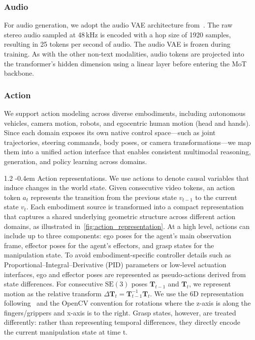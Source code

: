 \documentclass{llmxive}
\makeatletter
\providecommand{\paragraph}{  \@startsection{paragraph}{4}{\z@}    {1\baselineskip \@plus .2\baselineskip}    {-0.4em}    {\normalfont\normalsize\bfseries}}
\providecommand{\vidvar}{v}
\providecommand{\actvar}{a}
\providecommand{\vidtok}{\vidvar}
\providecommand{\acttok}{\actvar}
\makeatother
\begin{document}
\subsubsection{Audio}
For audio generation, we adopt the audio VAE architecture from~\citet{lee2024etta}. The raw stereo audio sampled at 48\,kHz is encoded with a hop size of 1920 samples, resulting in 25 tokens per second of audio. The audio VAE is frozen during training. As with the other non-text modalities, audio tokens are projected into the transformer's hidden dimension using a linear layer before entering the MoT backbone.

\subsubsection{Action}
\label{sec:action}
We support action modeling across diverse embodiments, including autonomous vehicles, camera motion, robots, and egocentric human motion (head and hands). Since each domain exposes its own native control space---such as joint trajectories, steering commands, body poses, or camera transformations---we map them into a unified action interface that enables consistent multimodal reasoning, generation, and policy learning across domains.

\paragraph{Action representations.}
We use actions to denote causal variables that induce changes in the world state.
Given consecutive video tokens, an action token $\acttok_{t}$ represents the transition from the previous state $\vidtok_{t{-}1}$ to the current state $\vidtok_{t}$.
Each embodiment source is transformed into a compact representation that captures a shared underlying geometric structure across different action domains, as illustrated in~\cref{fig:action_representation}.
At a high level, actions can include up to three components: ego poses for the agent's main observation frame, effector poses for the agent's effectors, and grasp states for the manipulation state.
To avoid embodiment-specific controller details such as Proportional–Integral–Derivative (PID) parameters or low-level actuation interfaces, ego and effector poses are represented as pseudo-actions derived from state differences.
For consecutive $\mathrm{SE}(3)$ poses $\mathbf{T}_{t-1}$ and $\mathbf{T}_t$, we represent motion as the relative transform $\Delta \mathbf{T}_t = \mathbf{T}_{t-1}^{-1}\mathbf{T}_t$.
We use the 6D representation following~\citet{zhou2019continuity} and the OpenCV convention for rotations where the z-axis is along the fingers/grippers and x-axis is to the right.
Grasp states, however, are treated differently: rather than representing temporal differences, they directly encode the current manipulation state at time t.
\end{document}
